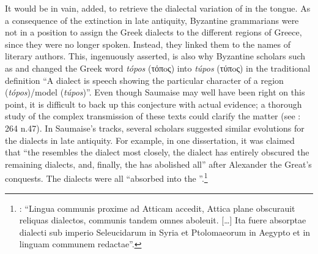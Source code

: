 It would be in vain, \citet[447–449]{Saumaise1643a} added, to retrieve the dialectal variation of  in the  tongue. As a consequence of the extinction in late antiquity, Byzantine grammarians were not in a position to assign the Greek dialects to the different regions of Greece, since they were no longer spoken. Instead, they linked them to the names of literary authors. This, \citet[450, 453–455]{Saumaise1643a} ingenuously asserted, is also why Byzantine scholars such as  and  changed the Greek word \textit{tópos} (τόπoς) into \textit{túpos} (τύπoς) in the traditional definition “A dialect is speech showing the particular character of a region (\textit{tópos})/model (\textit{túpos})”. Even though Saumaise may well have been right on this point, it is difficult to back up this conjecture with actual evidence; a thorough study of the complex transmission of these texts could clarify the matter (see \citealt{VanRooy2016d}: 264 n.47). In Saumaise’s tracks, several scholars suggested similar evolutions for the dialects in late antiquity. For example, in one dissertation, it was claimed that “the  resembles the  dialect most closely, the  dialect has entirely obscured the remaining dialects, and, finally, the  has abolished all” after Alexander the Great’s conquests. The dialects were all “absorbed into the ”.\footnote{\citet[\textsc{a.5}\textsc{\textsuperscript{r}}]{Schorling1678}: “Lingua communis proxime ad Atticam accedit, Attica plane obscurauit reliquas dialectos, communis tandem omnes aboleuit. […] Ita fuere absorptae dialecti sub imperio Seleucidarum in Syria et Ptolomaeorum in Aegypto et in linguam communem redactae”.}

